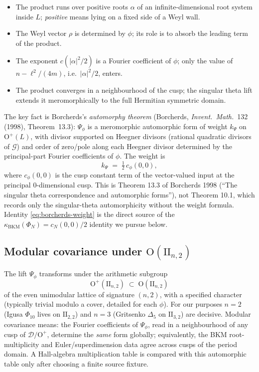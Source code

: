 \begin{itemize}
  \item The product runs over positive roots $\alpha$ of an infinite-dimensional root system inside $L$; \emph{positive} means lying on a fixed side of a Weyl wall.
  \item The Weyl vector $\rho$ is determined by $\phi$; its role is to absorb the leading term of the product.
  \item The exponent $c(|\alpha|^2 / 2)$ is a Fourier coefficient of $\phi$; only the value of $n - \ell^2/(4m)$, i.e.\ $|\alpha|^2/2$, enters.
  \item The product converges in a neighbourhood of the cusp; the singular theta lift extends it meromorphically to the full Hermitian symmetric domain.
\end{itemize}

The key fact is Borcherds's \emph{automorphy theorem} (Borcherds, \emph{Invent.\ Math.}~132 (1998), Theorem~13.3): $\Psi_\phi$ is a meromorphic automorphic form of weight $k_\Psi$ on $\mathrm{O}^+(L)$, with divisor supported on Heegner divisors (rational quadratic divisors of $\mathcal G$) and order of zero/pole along each Heegner divisor determined by the principal-part Fourier coefficients of $\phi$. The weight is
\begin{equation}
  k_\Psi \;=\; \tfrac12 \, c_\phi(0, 0),
  \label{eq:borcherds-weight}
\end{equation}
where $c_\phi(0, 0)$ is the cusp constant term of the vector-valued input at the principal $0$-dimensional cusp. This is Theorem 13.3 of Borcherds 1998 (``The singular theta correspondence and automorphic forms''), not Theorem 10.1, which records only the singular-theta automorphicity without the weight formula. Identity \eqref{eq:borcherds-weight} is the direct source of the $\kappa_{\mathrm{BKM}}(\Phi_N) = c_N(0, 0)/2$ identity we pursue below.

\subsection{Modular covariance under $\mathrm{O}(\mathrm{II}_{n, 2})$}

The lift $\Psi_\phi$ transforms under the arithmetic subgroup
\[
  \mathrm{O}^+(\mathrm{II}_{n, 2}) \;\subset\; \mathrm{O}(\mathrm{II}_{n, 2})
\]
of the even unimodular lattice of signature $(n, 2)$, with a specified character (typically trivial modulo a cover, detailed for each $\phi$). For our purposes $n = 2$ (Igusa $\Phi_{10}$ lives on $\mathrm{II}_{2, 2}$) and $n = 3$ (Gritsenko $\Delta_5$ on $\mathrm{II}_{3, 2}$) are decisive. Modular covariance means: the Fourier coefficients of $\Psi_\phi$, read in a neighbourhood of any cusp of $\mathcal D / \mathrm{O}^+$, determine the \emph{same} form globally; equivalently, the BKM root-multiplicity and Euler/superdimension data agree across cusps of the period domain. A Hall-algebra multiplication table is compared with this automorphic table only after choosing a finite source fixture.

